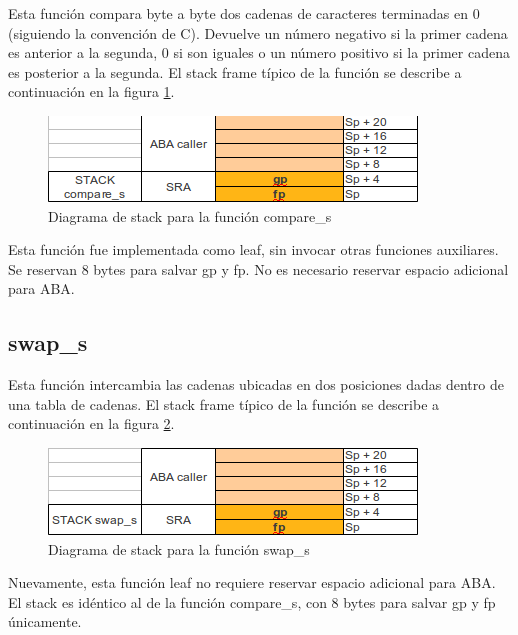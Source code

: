 \documentclass[a4paper,11pt]{article}
\begin{document}
Esta función compara byte a byte dos cadenas de caracteres terminadas en 0
(siguiendo la convención de C). Devuelve un número negativo si la primer cadena
es anterior a la segunda, 0 si son iguales o un número positivo si la primer
cadena es posterior a la segunda. El stack frame típico de la función se
describe a continuación en la figura \ref{fig:stackcompare}.

\begin{figure}[h!]
  \centering
  \includegraphics[width=\textwidth]{docs/stack_compare_s.png}
  \caption{Diagrama de stack para la función compare\_s} \label{fig:stackcompare}
\end{figure}

\FloatBarrier

Esta función fue implementada como leaf, sin invocar otras funciones
auxiliares. Se reservan 8 bytes para salvar gp y fp. No es necesario reservar
espacio adicional para ABA.

\subsection{swap\_s}

Esta función intercambia las cadenas ubicadas en dos posiciones dadas dentro de
una tabla de cadenas. El stack frame típico de la función se describe a
continuación en la figura \ref{fig:stackswap}.

\begin{figure}[h!]
  \centering
  \includegraphics[width=\textwidth]{docs/stack_swap_s.png}
  \caption{Diagrama de stack para la función swap\_s} \label{fig:stackswap}
\end{figure}

\FloatBarrier

Nuevamente, esta función leaf no requiere reservar espacio adicional para ABA.
El stack es idéntico al de la función compare\_s, con 8 bytes para salvar gp y
fp únicamente.
\end{document}
